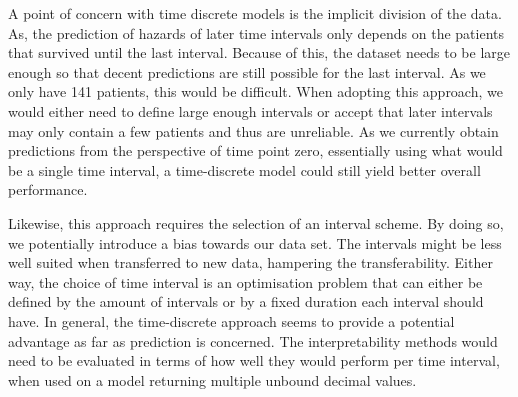 A point of concern with time discrete models is the implicit division of the data. As, the prediction of hazards of later time intervals only depends on the patients that survived until the last interval. Because of this, the dataset needs to be large enough so that decent predictions are still possible for the last interval. As we only have 141 patients, this would be difficult. When adopting this approach, we would either need to define large enough intervals or accept that later intervals may only contain a few patients and thus are unreliable. As we currently obtain predictions from the perspective of time point zero, essentially using what would be a single time interval, a time-discrete model could still yield better overall performance.

Likewise, this approach requires the selection of an interval scheme. By doing so, we potentially introduce a bias towards our data set. The intervals might be less well suited when transferred to new data, hampering the transferability. Either way, the choice of time interval is an optimisation problem that can either be defined by the amount of intervals or by a fixed duration each interval should have. In general, the time-discrete approach seems to provide a potential advantage as far as prediction is concerned. The interpretability methods would need to be evaluated in terms of how well they would perform per time interval, when used on a model returning multiple unbound decimal values.  


